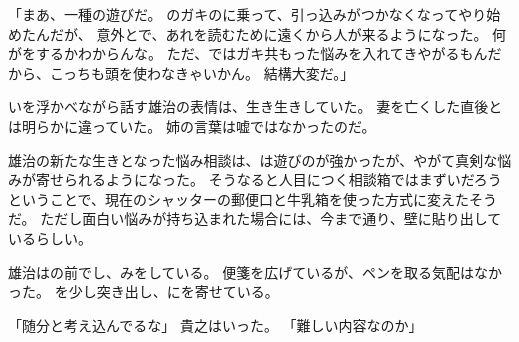 \documentclass[chapter3.tex]{subfiles}
\begin{document}
\begin{CJK}{UTF8}{ipxm}
    「まあ、一種の遊びだ。
    のガキのに乗って、引っ込みがつかなくなってやり始めたんだが、
    意外とで、あれを読むために遠くから人が来るようになった。
    何がをするかわからんな。
    ただ、ではガキ共もった悩みを入れてきやがるもんだから、こっちも頭を使わなきゃいかん。
    結構大変だ。」

    いを浮かべながら話す雄治の表情は、生き生きしていた。
    妻を亡くした直後とは明らかに違っていた。
    姉の言葉は嘘ではなかったのだ。

    雄治の新たな生きとなった悩み相談は、は遊びのが強かったが、やがて真剣な悩みが寄せられるようになった。
    そうなると人目につく相談箱ではまずいだろうということで、現在のシャッターの郵便口と牛乳箱を使った方式に変えたそうだ。
    ただし面白い悩みが持ち込まれた場合には、今まで通り、壁に貼り出しているらしい。

    雄治はの前でし、みをしている。
    便箋を広げているが、ペンを取る気配はなかった。
    を少し突き出し、にを寄せている。
    
    「随分と考え込んでるな」
    貴之はいった。
    「難しい内容なのか」

    

\end{CJK}
\end{document}

